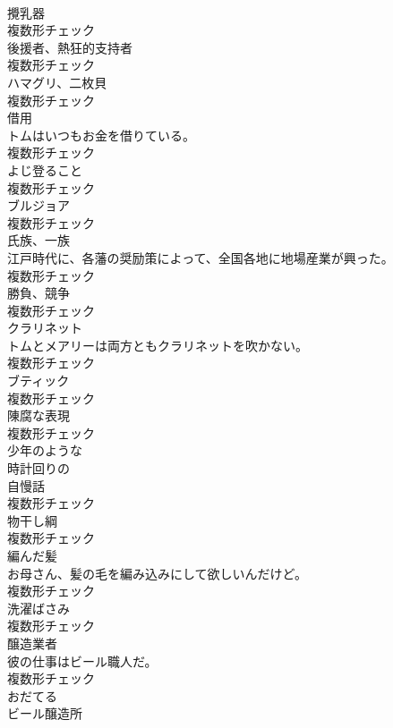 \documentclass[8pt]{extreport}
\begin{document}
\begin{CJK}{UTF8}{min}
\\	[名詞]	攪乳器	
\\	複数形チェック
\\	[名詞]	後援者、熱狂的支持者	
\\	複数形チェック
\\	[名詞]	ハマグリ、二枚貝	
\\	複数形チェック
\\	[名詞]	借用	
\\	トムはいつもお金を借りている。	
\\	複数形チェック
\\	[名詞]	よじ登ること	
\\	複数形チェック
\\	[名詞]	ブルジョア	
\\	複数形チェック
\\	[名詞]	氏族、一族	
\\	江戸時代に、各藩の奨励策によって、全国各地に地場産業が興った。	
\\	複数形チェック
\\	[名詞]	勝負、競争	
\\	複数形チェック
\\	[名詞]	クラリネット	
\\	トムとメアリーは両方ともクラリネットを吹かない。	
\\	複数形チェック
\\	[名詞]	ブティック	
\\	複数形チェック
\\	[名詞]	陳腐な表現	
\\	複数形チェック
\\	[形容詞]	少年のような	
\\	[形容詞]	時計回りの	
\\	[名詞]	自慢話	
\\	複数形チェック
\\	[名詞]	物干し綱	
\\	複数形チェック
\\	[名詞]	編んだ髪	
\\	お母さん、髪の毛を編み込みにして欲しいんだけど。	
\\	複数形チェック
\\	[名詞]	洗濯ばさみ	
\\	複数形チェック
\\	[名詞]	醸造業者	
\\	彼の仕事はビール職人だ。	
\\	複数形チェック
\\	[動詞]	おだてる	
\\	[名詞]	ビール醸造所	

\end{CJK}
\end{document}
